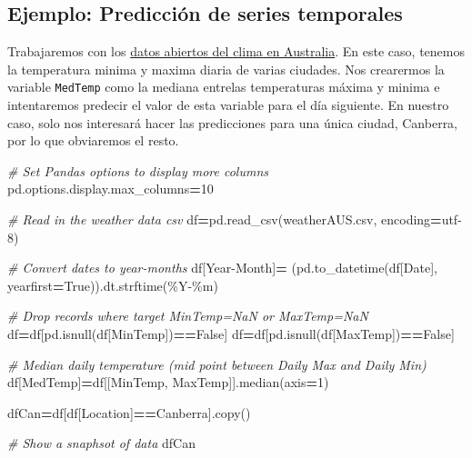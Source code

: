 \documentclass[
  a4paper,
  DIV=11,
  numbers=noendperiod]{scrreprt}
\newenvironment{Shaded}{\begin{snugshade}}{\end{snugshade}}
\newcommand{\CommentTok}[1]{\textcolor[rgb]{0.56,0.35,0.01}{\textit{#1}}}
\newcommand{\DecValTok}[1]{\textcolor[rgb]{0.00,0.00,0.81}{#1}}
\newcommand{\NormalTok}[1]{#1}
\newcommand{\OperatorTok}[1]{\textcolor[rgb]{0.81,0.36,0.00}{\textbf{#1}}}
\newcommand{\StringTok}[1]{\textcolor[rgb]{0.31,0.60,0.02}{#1}}
\newcommand{\VariableTok}[1]{\textcolor[rgb]{0.00,0.00,0.00}{#1}}
\begin{document}
\subsection{Ejemplo: Predicción de series
temporales}\label{ejemplo-predicciuxf3n-de-series-temporales}

Trabajaremos con los
\href{https://www.kaggle.com/datasets/jsphyg/weather-dataset-rattle-package}{datos
abiertos del clima en Australia}. En este caso, tenemos la temperatura
minima y maxima diaria de varias ciudades. Nos crearermos la variable
\texttt{MedTemp} como la mediana entrelas temperaturas máxima y minima e
intentaremos predecir el valor de esta variable para el día siguiente.
En nuestro caso, solo nos interesará hacer las predicciones para una
única ciudad, Canberra, por lo que obviaremos el resto.

\begin{Shaded}
\begin{Highlighting}[numbers=left,,]
\CommentTok{\# Set Pandas options to display more columns}
\NormalTok{pd.options.display.max\_columns}\OperatorTok{=}\DecValTok{10}

\CommentTok{\# Read in the weather data csv}
\NormalTok{df}\OperatorTok{=}\NormalTok{pd.read\_csv(}\StringTok{\textquotesingle{}weatherAUS.csv\textquotesingle{}}\NormalTok{, encoding}\OperatorTok{=}\StringTok{\textquotesingle{}utf{-}8\textquotesingle{}}\NormalTok{)}

\CommentTok{\# Convert dates to year{-}months}
\NormalTok{df[}\StringTok{\textquotesingle{}Year{-}Month\textquotesingle{}}\NormalTok{]}\OperatorTok{=}\NormalTok{ (pd.to\_datetime(df[}\StringTok{\textquotesingle{}Date\textquotesingle{}}\NormalTok{], yearfirst}\OperatorTok{=}\VariableTok{True}\NormalTok{)).dt.strftime(}\StringTok{\textquotesingle{}\%Y{-}\%m\textquotesingle{}}\NormalTok{)}

\CommentTok{\# Drop records where target MinTemp=NaN or MaxTemp=NaN}
\NormalTok{df}\OperatorTok{=}\NormalTok{df[pd.isnull(df[}\StringTok{\textquotesingle{}MinTemp\textquotesingle{}}\NormalTok{])}\OperatorTok{==}\VariableTok{False}\NormalTok{]}
\NormalTok{df}\OperatorTok{=}\NormalTok{df[pd.isnull(df[}\StringTok{\textquotesingle{}MaxTemp\textquotesingle{}}\NormalTok{])}\OperatorTok{==}\VariableTok{False}\NormalTok{]}

\CommentTok{\# Median daily temperature (mid point between Daily Max and Daily Min)}
\NormalTok{df[}\StringTok{\textquotesingle{}MedTemp\textquotesingle{}}\NormalTok{]}\OperatorTok{=}\NormalTok{df[[}\StringTok{\textquotesingle{}MinTemp\textquotesingle{}}\NormalTok{, }\StringTok{\textquotesingle{}MaxTemp\textquotesingle{}}\NormalTok{]].median(axis}\OperatorTok{=}\DecValTok{1}\NormalTok{)}

\NormalTok{dfCan}\OperatorTok{=}\NormalTok{df[df[}\StringTok{\textquotesingle{}Location\textquotesingle{}}\NormalTok{]}\OperatorTok{==}\StringTok{\textquotesingle{}Canberra\textquotesingle{}}\NormalTok{].copy()}

\CommentTok{\# Show a snaphsot of data}
\NormalTok{dfCan}
\end{Highlighting}
\end{Shaded}
\end{document}
